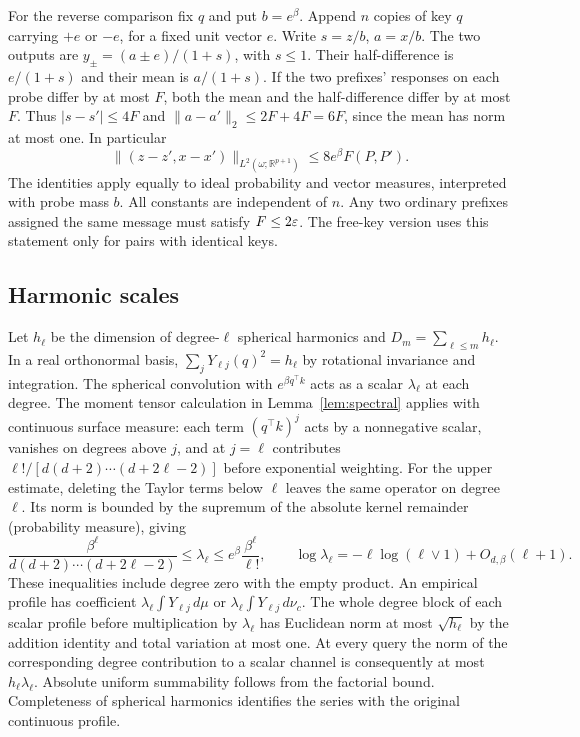 For the reverse comparison fix $q$ and put $b=e^\beta$. Append $n$ copies of key $q$ carrying $+e$ or $-e$, for a fixed unit vector $e$. Write $s=z/b$, $a=x/b$. The two outputs are $y_\pm=(a\pm e)/(1+s)$, with $s\le1$. Their half-difference is $e/(1+s)$ and their mean is $a/(1+s)$. If the two prefixes' responses on each probe differ by at most $F$, both the mean and the half-difference differ by at most $F$. Thus $|s-s'|\le4F$ and $\|a-a'\|_2\le 2F+4F=6F$, since the mean has norm at most one. In particular
\begin{equation}
 \| (z-z',x-x')\|_{L^2(\omega;\mathbb R^{p+1})}\le 8e^\beta F(P,P').
 \label{eq:inverse}
\end{equation}
The identities apply equally to ideal probability and vector measures, interpreted with probe mass $b$. All constants are independent of $n$. Any two ordinary prefixes assigned the same message must satisfy $F\le2\varepsilon$. The free-key version uses this statement only for pairs with identical keys.

\subsection{Harmonic scales}
Let $h_\ell$ be the dimension of degree-$\ell$ spherical harmonics and $D_m=\sum_{\ell\le m}h_\ell$. In a real orthonormal basis, $\sum_jY_{\ell j}(q)^2=h_\ell$ by rotational invariance and integration. The spherical convolution with $e^{\beta q^\top k}$ acts as a scalar $\lambda_\ell$ at each degree. The moment tensor calculation in Lemma~\ref{lem:spectral} applies with continuous surface measure: each term $(q^\top k)^j$ acts by a nonnegative scalar, vanishes on degrees above $j$, and at $j=\ell$ contributes $\ell!/[d(d+2)\cdots(d+2\ell-2)]$ before exponential weighting. For the upper estimate, deleting the Taylor terms below $\ell$ leaves the same operator on degree $\ell$. Its norm is bounded by the supremum of the absolute kernel remainder (probability measure), giving
\[
 \frac{\beta^\ell}{d(d+2)\cdots(d+2\ell-2)}\le \lambda_\ell
 \le e^\beta\frac{\beta^\ell}{\ell!},\qquad
 \log\lambda_\ell=-\ell\log(\ell\vee1)+O_{d,\beta}(\ell+1).
\]
These inequalities include degree zero with the empty product. An empirical profile has coefficient $\lambda_\ell\int Y_{\ell j}\,d\mu$ or $\lambda_\ell\int Y_{\ell j}\,d\nu_c$. The whole degree block of each scalar profile before multiplication by $\lambda_\ell$ has Euclidean norm at most $\sqrt{h_\ell}$ by the addition identity and total variation at most one. At every query the norm of the corresponding degree contribution to a scalar channel is consequently at most $h_\ell\lambda_\ell$. Absolute uniform summability follows from the factorial bound. Completeness of spherical harmonics identifies the series with the original continuous profile.

